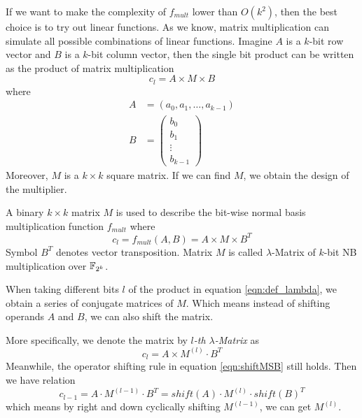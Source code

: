 If we want to make the complexity of $f_{mult}$ lower than $O(k^2)$, then the best choice is to try out 
linear functions. As we know, matrix multiplication can simulate all possible combinations of 
linear functions. 
Imagine $A$ is a $k$-bit row vector and $B$ is a $k$-bit 
column vector, then the single bit product can be written as the product of matrix multiplication
$$c_{l} = A\times M\times B$$
where 
\begin{align*}
A &= (a_0,a_1,\dots,a_{k-1})\\
B &= \begin{pmatrix}
b_0 \\
b_1 \\
\vdots \\
b_{k-1}
\end{pmatrix}
\end{align*}
Moreover, $M$ is a $k\times k$ square matrix. If we can find $M$, we obtain the design of the multiplier.

\begin{Definition}
A binary $k\times k$ matrix $M$ is used to describe the bit-wise normal basis multiplication function $f_{mult}$ where
\begin{equation}
\label{eqn:def_lambda}
c_{l} = f_{mult}(A, B) = A \times M \times B^T
\end{equation}
Symbol $B^T$ denotes vector transposition. Matrix $M$ is called $\lambda$-Matrix of
$k$-bit NB multiplication over ${\mathbb{F}}_{2^k}$.
\end{Definition} 

When taking different bits $l$ of the product in equation \ref{eqn:def_lambda}, 
we obtain a series of conjugate matrices of $M$. 
Which means instead of shifting operands $A$ and $B$, we can also shift the 
matrix.

More specifically, we denote the matrix by \emph{$l$-th $\lambda$-Matrix} as 
$$c_l = A \times M^{(l)} \cdot B^T$$
Meanwhile, the operator shifting rule in equation \ref{eqn:shiftMSB} still holds. Then we have relation 
$$c_{l-1} = A \cdot M^{(l-1)} \cdot B^T = shift(A) \cdot M^{(l)} \cdot shift(B)^T$$ which means
by right and down cyclically shifting $M^{(l-1)}$, we can get $M^{(l)}$.

